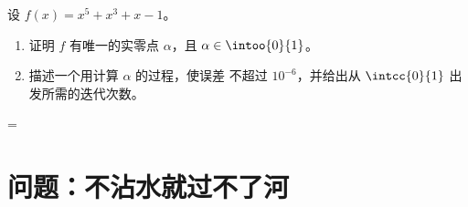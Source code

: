\begin{exercise}[$\star\star\star$]\label{exo:g12:limcont:9}
  设 $f(x) = x^5 + x^3 + x - 1$。
\begin{enumerate}
  \item 证明 $f$ 有唯一的实零点 $\alpha$，且
        $\alpha \in \intoo{0}{1}$。
  \item 描述一个用计算 $\alpha$ 的过程，使误差
        不超过 $10^{-6}$，并给出从
        $\intcc{0}{1}$ 出发所需的迭代次数。
\end{enumerate}
\end{exercise}

=\section{问题：不沾水就过不了河}

